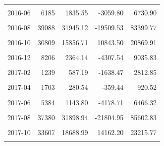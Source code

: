 \begin{longtable}[t]{crrrr}
\cellcolor{gray!10}{2016-05} & \cellcolor{gray!10}{3287} & \cellcolor{gray!10}{690.50} & \cellcolor{gray!10}{-799.99} & \cellcolor{gray!10}{2181.00}\\
2016-06 & 6185 & 1835.55 & -3059.80 & 6730.90\\
\cellcolor{gray!10}{2016-07} & \cellcolor{gray!10}{19242} & \cellcolor{gray!10}{9186.45} & \cellcolor{gray!10}{4912.05} & \cellcolor{gray!10}{13460.86}\\
2016-08 & 39088 & 31945.12 & -19509.53 & 83399.77\\
\cellcolor{gray!10}{2016-09} & \cellcolor{gray!10}{42209} & \cellcolor{gray!10}{21369.15} & \cellcolor{gray!10}{-15891.83} & \cellcolor{gray!10}{58630.12}\\
2016-10 & 30809 & 15856.71 & 10843.50 & 20869.91\\
\cellcolor{gray!10}{2016-11} & \cellcolor{gray!10}{19160} & \cellcolor{gray!10}{9320.56} & \cellcolor{gray!10}{-12791.55} & \cellcolor{gray!10}{31432.67}\\
2016-12 & 8206 & 2364.14 & -4307.54 & 9035.83\\
\cellcolor{gray!10}{2017-01} & \cellcolor{gray!10}{2253} & \cellcolor{gray!10}{593.75} & \cellcolor{gray!10}{-1078.46} & \cellcolor{gray!10}{2265.96}\\
2017-02 & 1239 & 587.19 & -1638.47 & 2812.85\\
\cellcolor{gray!10}{2017-03} & \cellcolor{gray!10}{1920} & \cellcolor{gray!10}{105.11} & \cellcolor{gray!10}{-1100.22} & \cellcolor{gray!10}{1310.43}\\
2017-04 & 1703 & 280.54 & -359.44 & 920.52\\
\cellcolor{gray!10}{2017-05} & \cellcolor{gray!10}{2571} & \cellcolor{gray!10}{-63.92} & \cellcolor{gray!10}{-1976.15} & \cellcolor{gray!10}{1848.31}\\
2017-06 & 5384 & 1143.80 & -4178.71 & 6466.32\\
\cellcolor{gray!10}{2017-07} & \cellcolor{gray!10}{17568} & \cellcolor{gray!10}{8021.52} & \cellcolor{gray!10}{3124.57} & \cellcolor{gray!10}{12918.47}\\
2017-08 & 37380 & 31898.94 & -21804.95 & 85602.83\\
\cellcolor{gray!10}{2017-09} & \cellcolor{gray!10}{72895} & \cellcolor{gray!10}{41033.47} & \cellcolor{gray!10}{22220.36} & \cellcolor{gray!10}{59846.57}\\
2017-10 & 33607 & 18688.99 & 14162.20 & 23215.77\\
\cellcolor{gray!10}{2017-11} & \cellcolor{gray!10}{19334} & \cellcolor{gray!10}{9472.06} & \cellcolor{gray!10}{-12438.81} & \cellcolor{gray!10}{31382.94}\\

\end{longtable}

